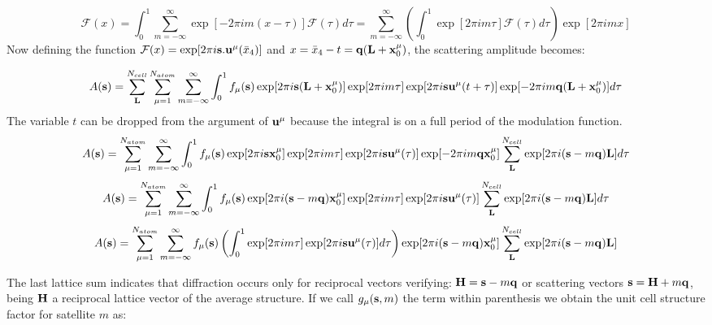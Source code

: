 \documentclass[10pt]{article}
\begin{document}
\begin{equation} \label{delta_2}
\mathcal{F}(x)= \int_{0}^{1} \sum_{m=-\infty}^{\infty} \exp[-2\pi i m(x-\tau)]  \mathcal{F}(\tau) d\tau = \sum_{m=-\infty}^{\infty}\left ( \int_{0}^{1} \exp[2\pi i m \tau]  \mathcal{F}(\tau) d\tau \right ) \exp[2 \pi i m x]
\end{equation}
Now defining the function $\mathcal{F}(x)=\exp[2 \pi i {\bf s}.{\bf u}^{\mu}(\bar x_4)]$ and $x=\bar x_4 -t ={\bf q} ({\bf L} +  {\bf x}_0^{\mu}) $, the scattering amplitude becomes:

\begin{equation} \label{scat_amplitude2}
A({\bf s})= \sum_{\bf L}^{N_{cell}} \sum_{\mu=1}^{N_{atom}} \sum_{m=-\infty}^{\infty} \int_{0}^{1} f_{\mu}({\bf s}) \exp[2 \pi i {\bf s}({\bf L} + {\bf x}_0^{\mu})] \exp[2 \pi i m \tau]  \exp [2 \pi i{\bf s}{\bf u}^{\mu}(t+\tau)] \exp [-2 \pi i m{\bf q}({\bf L} + {\bf x}_0^{\mu})] d\tau
\end{equation}
The variable $t$ can be dropped from the argument of ${\bf u}^\mu$ because the integral is on a full period of the modulation function.
\begin{equation} \label{scat_amplitude3}
A({\bf s})=  \sum_{\mu=1}^{N_{atom}} \sum_{m=-\infty}^{\infty} \int_{0}^{1} f_{\mu}({\bf s}) \exp[2 \pi i {\bf s} {\bf x}_0^{\mu}] \exp[2 \pi i m \tau]  \exp [2 \pi i{\bf s}{\bf u}^{\mu}(\tau)] \exp [-2 \pi i m{\bf q} {\bf x}_0^{\mu}] \sum_{\bf L}^{N_{cell}} \exp[2 \pi i ({\bf s}-m{\bf q}){\bf L}] d\tau
\end{equation}
\begin{equation} \label{scat_amplitude4}
A({\bf s})=  \sum_{\mu=1}^{N_{atom}} \sum_{m=-\infty}^{\infty} \int_{0}^{1} f_{\mu}({\bf s}) \exp[2 \pi i( {\bf s}-m{\bf q}) {\bf x}_0^{\mu}] \exp[2 \pi i m \tau]  \exp [2 \pi i{\bf s}{\bf u}^{\mu}(\tau)]  \sum_{\bf L}^{N_{cell}} \exp[2 \pi i ({\bf s}-m{\bf q}){\bf L}] d\tau
\end{equation}
\begin{equation} \label{scat_amplitude5}
A({\bf s})=  \sum_{\mu=1}^{N_{atom}}\sum_{m=-\infty}^{\infty} f_{\mu}({\bf s}) \left (   \int_{0}^{1}   \exp[2 \pi i m \tau]  \exp [2 \pi i{\bf s}{\bf u}^{\mu}(\tau)] d\tau \right )   \exp[2 \pi i( {\bf s}-m{\bf q}) {\bf x}_0^{\mu}] \sum_{\bf L}^{N_{cell}} \exp[2 \pi i ({\bf s}-m{\bf q}){\bf L}] 
\end{equation}

The last lattice sum indicates that diffraction occurs only for reciprocal vectors verifying: ${\bf H} = {\bf s} - m{\bf q}$ or scattering vectors ${\bf s} = {\bf H} + m{\bf q}$, being ${\bf H}$ a reciprocal lattice vector of the average structure. If we call $g_\mu({\bf s},m)$ the term within parenthesis we obtain the unit cell structure factor for satellite $m$ as:
\end{document}
